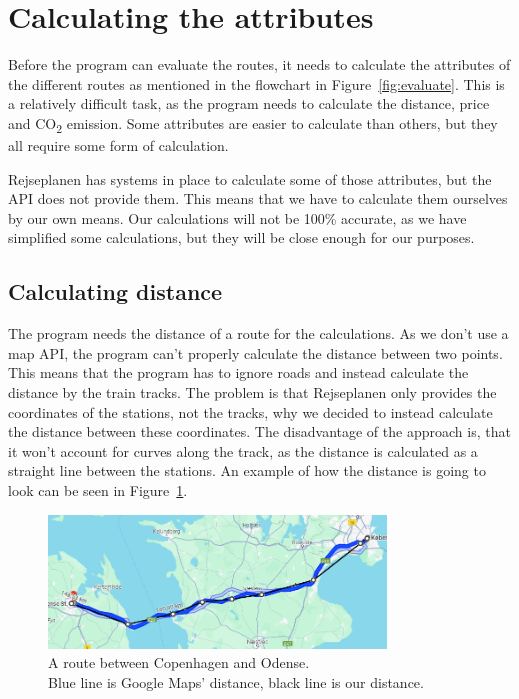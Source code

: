 \section{Calculating the attributes}\label{sec:calculations}

Before the program can evaluate the routes, it needs to calculate the attributes of the different routes as mentioned in
the flowchart in Figure~\ref{fig:evaluate}.
This is a relatively difficult task, as the program needs to calculate the distance, price and \unit{CO_{2}} emission.
Some attributes are easier to calculate than others, but they all require some form of calculation.

Rejseplanen has systems in place to calculate some of those attributes, but the API does not provide them.
This means that we have to calculate them ourselves by our own means.
Our calculations will not be 100\% accurate, as we have simplified some calculations, but they will be close
enough for our purposes.

\subsection{Calculating distance}\label{subsec:calculating-distance}

The program needs the distance of a route for the calculations.
As we don't use a map API, the program can't properly calculate the distance between two points.
This means that the program has to ignore roads and instead calculate the distance by the train tracks.
The problem is that Rejseplanen only provides the coordinates of the stations, not the tracks, why we decided to instead
calculate the distance between these coordinates.
The disadvantage of the approach is, that it won't account for curves along the track, as the distance is calculated as
a straight line between the stations.
An example of how the distance is going to look can be seen in Figure~\ref{fig:image-google-maps-distance-calculation}.

\begin{figure}[H]
    \centering
    \includegraphics[width=0.8\textwidth]{images/google-maps-distance-calculation}
    \captionsetup{justification=centering}
    \caption{A route between Copenhagen and Odense. \\ Blue line is Google Maps' distance, black line is our distance.}
    \label{fig:image-google-maps-distance-calculation}
\end{figure}

